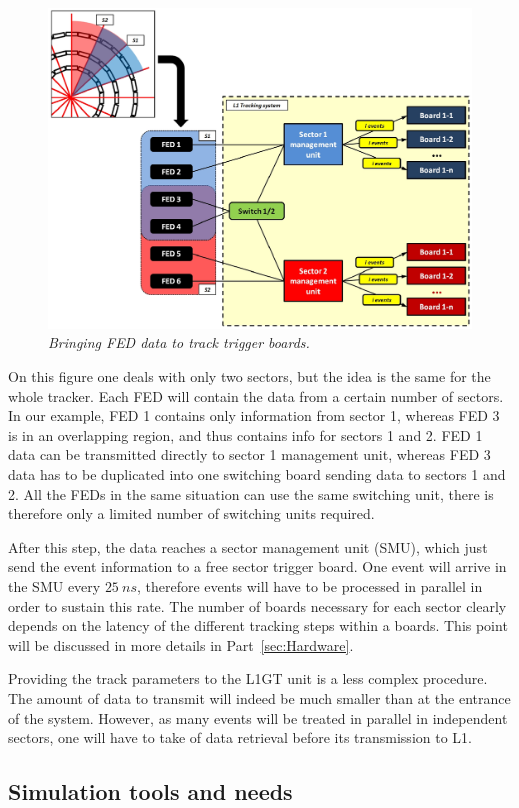 \begin{figure}[ht!]
\centering
\includegraphics[width=0.7\columnwidth]{Plots/TTmapping.eps}
\caption{\emph{Bringing FED data to track trigger boards.}}
\label{fig:L1TTmap}
\end{figure}

\noindent On this figure one deals with only two sectors, but the idea is the same for the whole tracker. Each FED will contain the data from a certain number of sectors. In our example, FED 1 contains only information from sector 1, whereas FED 3 is in an overlapping region, and thus contains info for sectors 1 and 2. FED 1 data can be transmitted directly to sector 1 management unit, whereas FED 3 data has to be duplicated into one switching board sending data to sectors 1 and 2. All the FEDs in the same situation can use the same switching unit, there is therefore only a limited number of switching units required.

\noindent After this step, the data reaches a sector management unit (SMU), which just send the event information to a free sector trigger board. One event will arrive in the SMU every $25~ns$, therefore events will have to be processed in parallel in order to sustain this rate. The number of boards necessary for each sector clearly depends on the latency of the different tracking steps within a boards. This point will be discussed in more details in Part~\ref{sec:Hardware}.

\noindent Providing the track parameters to the L1GT unit is a less complex procedure. The amount of data to transmit will indeed be much smaller than at the entrance of the system. However, as many events will be treated in parallel in independent sectors, one will have to take of data retrieval before its transmission to L1.

\subsection{Simulation tools and needs}


\clearpage

